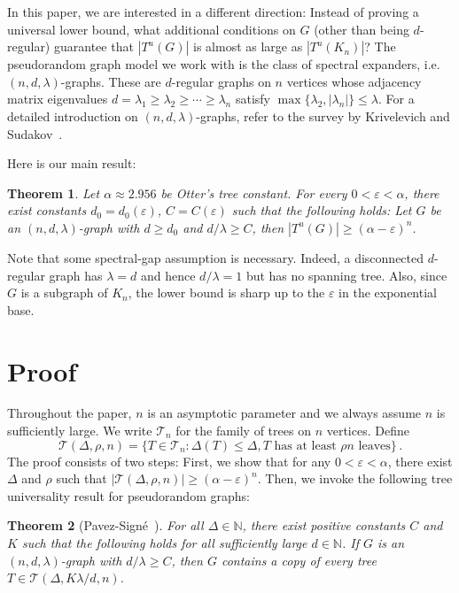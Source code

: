 \documentclass[reqno,final,a4paper]{amsart}
\numberwithin{equation}{section}
\newtheorem{theorem}{Theorem}[section]
\theoremstyle{definition}
\theoremstyle{remark}
\newcommand{\eps}{\varepsilon}
\begin{document}
In this paper, we are interested in a different direction: Instead of proving a universal lower bound, what additional conditions on $G$ (other than being $d$-regular) guarantee that $|T^u(G)|$ is almost as large as $|T^u(K_n)|$? 
The pseudorandom graph model we work with is the class of spectral expanders, i.e.\ $(n,d,\lambda)$-graphs. These are $d$-regular graphs on $n$ vertices whose adjacency matrix eigenvalues $d = \lambda_1\geq \lambda_2\geq \cdots \geq \lambda_n$ satisfy $\max\{\lambda_2, |\lambda_n|\}\leq \lambda$. For a detailed introduction on $(n,d,\lambda)$-graphs, refer to the survey by Krivelevich and Sudakov~\cite{survey}.

Here is our main result:
\begin{theorem}\label{thm:main}
    Let $\alpha\approx 2.956$ be Otter's tree constant.
    For every $0<\eps <\alpha$, there exist constants $d_0 = d_0(\eps)$, $C= C(\eps)$ such that the following holds: Let $G$ be an $(n,d,\lambda)$-graph with $d\geq d_0$ and $d/\lambda \geq C$, then $|T^u(G)|\geq (\alpha -\eps)^n$.
\end{theorem}
Note that some spectral-gap assumption is necessary. Indeed, a disconnected $d$-regular graph has $\lambda = d$ and hence $d/\lambda = 1$ but has no spanning tree.
Also, since $G$ is a subgraph of $K_n$, the lower bound is sharp up to the $\eps$ in the exponential base.

\section{Proof}
Throughout the paper, $n$ is an asymptotic parameter and we always assume $n$ is sufficiently large. We write $\mathcal T_n$ for the family of trees on $n$ vertices.
Define 
\[
    \mathcal T(\Delta,\rho,n) =\{T\in \mathcal T_n: \Delta(T)\leq \Delta, T \text{ has at least $\rho n$ leaves}\}\,.
\]
The proof consists of two steps: First, we show that for any $0<\eps<\alpha$, there exist $\Delta$ and $\rho$ such that $|\mathcal T(\Delta, \rho,n)|\geq (\alpha -\eps)^n$. Then, we invoke the following tree universality result for pseudorandom graphs:
\begin{theorem}[{Pavez-Signé~\cite[Theorem 4.2]{Pavez-Signe}}]\label{thm:ndlambda-universal} For all $\Delta \in \mathbb N$, there exist positive constants $C$ and $K$ such that the following holds for all sufficiently large $d\in \mathbb N$. If $G$ is an $(n,d,\lambda)$-graph with $d/\lambda\geq C$, then $G$ contains a copy of every tree $T\in \mathcal T(\Delta, K\lambda/d, n)$. 
\end{theorem}
\end{document}
